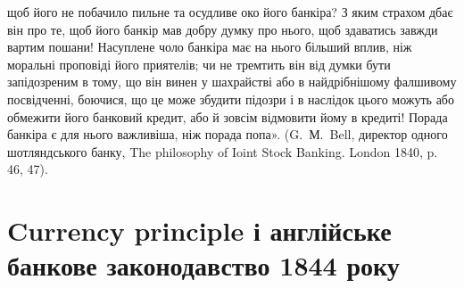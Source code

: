 \parcont{}  %
щоб його не побачило пильне та осудливе око його банкіра? З яким страхом
дбає він про те, щоб його банкір мав добру думку про нього, щоб здаватись
завжди вартим пошани! Насуплене чоло банкіра має на нього більший вплив,
ніж моральні проповіді його приятелів; чи не тремтить він від думки бути запідозреним
в тому, що він винен у шахрайстві або в найдрібнішому фалшивому
посвідченні, боючися, що це може збудити підозри і в наслідок цього можуть
або обмежити його банковий кредит, або й зовсім відмовити йому в кредиті!
Порада банкіра є для нього важливіша, ніж порада попа». (G.~М.~Bell, директор
одного шотляндського банку, The philosophy of Ioint Stock Banking. London 1840,
p. 46, 47).

\section{%
Currency principle і англійське банкове законодавство 1844 року}

